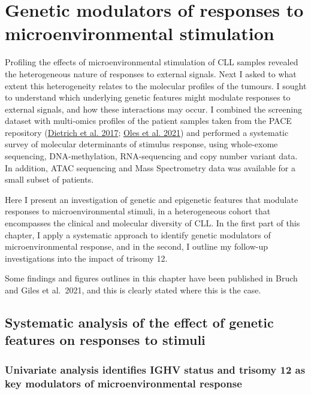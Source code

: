 \documentclass[11pt, a4paper, twosided]{book}
\begin{document}
\hypertarget{chapter5}{%
\chapter{Genetic modulators of responses to microenvironmental stimulation}\label{chapter5}}

Profiling the effects of microenvironmental stimulation of CLL samples revealed the heterogeneous nature of responses to external signals. Next I asked to what extent this heterogeneity relates to the molecular profiles of the tumours. I sought to understand which underlying genetic features might modulate responses to external signals, and how these interactions may occur. I combined the screening dataset with multi-omics profiles of the patient samples taken from the PACE repository (\protect\hyperlink{ref-JCIpaper}{Dietrich et al. 2017}; \protect\hyperlink{ref-R-BloodCancerMultiOmics2017}{Oles et al. 2021}) and performed a systematic survey of molecular determinants of stimulus response, using whole-exome sequencing, DNA-methylation, RNA-sequencing and copy number variant data. In addition, ATAC sequencing and Mass Spectrometry data was available for a small subset of patients.

Here I present an investigation of genetic and epigenetic features that modulate responses to microenvironmental stimuli, in a heterogeneous cohort that encompasses the clinical and molecular diversity of CLL. In the first part of this chapter, I apply a systematic approach to identify genetic modulators of microenvironmental response, and in the second, I outline my follow-up investigations into the impact of trisomy 12.

Some findings and figures outlines in this chapter have been published in Bruch and Giles et al.~2021, and this is clearly stated where this is the case.

\hypertarget{systematic-analysis-of-the-effect-of-genetic-features-on-responses-to-stimuli}{%
\section{Systematic analysis of the effect of genetic features on responses to stimuli}\label{systematic-analysis-of-the-effect-of-genetic-features-on-responses-to-stimuli}}

\hypertarget{univariate-gene-stimulus-assosciations}{%
\subsection{Univariate analysis identifies IGHV status and trisomy 12 as key modulators of microenvironmental response}\label{univariate-gene-stimulus-assosciations}}
\end{document}
